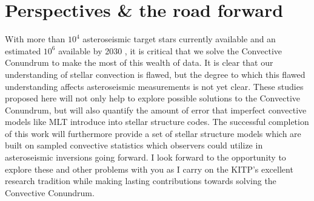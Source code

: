 \documentclass[preprint, hmargin=1in, vmargin=1in]{aastex62}
\begin{document}
\section*{\textbf{Perspectives \& the road forward}}
With more than $10^4$ asteroseismic target stars currently available and an estimated $10^6$ available by 2030 \citep{huber&all2019}, it is critical that we solve the Convective Conundrum to make the most of this wealth of data.
It is clear that our understanding of stellar convection is flawed, but the degree to which this flawed understanding affects asteroseismic measurements is not yet clear.
These studies proposed here will not only help to explore possible solutions to the Convective Conundrum, but will also quantify the amount of error that imperfect convective models like MLT introduce into stellar structure codes.
The successful completion of this work will furthermore provide a set of stellar structure models which are built on sampled convective statistics which observers could utilize in asteroseismic inversions going forward.
I look forward to the opportunity to explore these and other problems with you as I carry on the KITP's excellent research tradition while making lasting contributions towards solving the Convective Conundrum.



\end{document}
